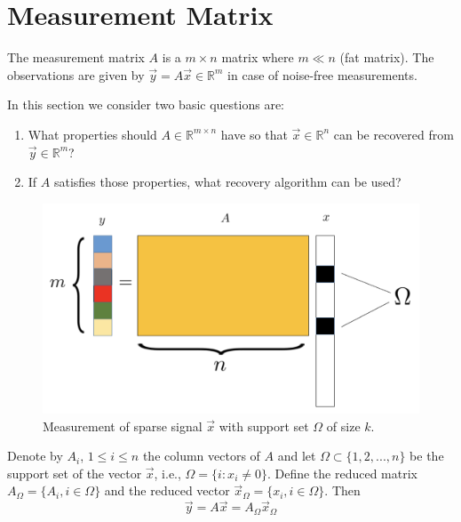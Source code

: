 \documentclass[11pt]{elegantbook}
\begin{document}
\section{Measurement Matrix}
\begin{definition}
    The measurement matrix $A$ is a $m\times n$ matrix where $m \ll n$ (fat matrix). The observations are given by $\vec{y} = A \vec{x} \in \mathbb{R}^m$ in case of noise-free measurements.
\end{definition}
In this section we consider two basic questions are:
\begin{enumerate}
    \item What properties should $A\in \mathbb{R}^{m\times n}$ have so that $\vec{x}\in \mathbb{R}^n$ can be recovered from $\vec{y}\in \mathbb{R}^m$?
    \item If $A$ satisfies those properties, what recovery algorithm can be used?
\end{enumerate}

\begin{center}\begin{figure}[htbp]
    \centering
    \includegraphics[scale=0.2]{MM.png}
    \caption{Measurement of sparse signal $\vec{x}$ with support set $\Omega$ of size $k$.}
    \label{}
\end{figure}\end{center}
Denote by $A_i$, $1 \leq i \leq n$ the column vectors of $A$ and let $\Omega \subset \{1,2,...,n\}$ be the support set of the vector $\vec{x}$, i.e., $\Omega = \{i : x_i \neq 0\}$. Define the reduced matrix $A_\Omega = \{A_i, i \in \Omega\}$ and the reduced vector $\vec{x}_\Omega =\{x_i, i\in \Omega\}$. Then $$\vec{y}=A \vec{x}=A_\Omega \vec{x}_\Omega $$
\end{document}
